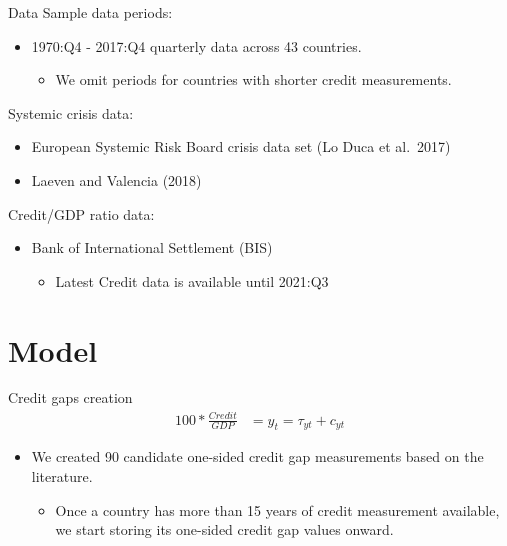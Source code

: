 \documentclass[
  ignorenonframetext,
]{beamer}
\providecommand{\tightlist}{%
  \setlength{\itemsep}{0pt}\setlength{\parskip}{0pt}}
\begin{document}
\begin{frame}{Data}
\protect\hypertarget{data}{}
Sample data periods:

\begin{itemize}
\tightlist
\item
  1970:Q4 - 2017:Q4 quarterly data across 43 countries.

  \begin{itemize}
  \tightlist
  \item
    We omit periods for countries with shorter credit measurements.
  \end{itemize}
\end{itemize}

Systemic crisis data:

\begin{itemize}
\tightlist
\item
  European Systemic Risk Board crisis data set (Lo Duca et al.~2017)
\item
  Laeven and Valencia (2018)
\end{itemize}

Credit/GDP ratio data:

\begin{itemize}
\tightlist
\item
  Bank of International Settlement (BIS)

  \begin{itemize}
  \tightlist
  \item
    Latest Credit data is available until 2021:Q3
  \end{itemize}
\end{itemize}
\end{frame}

\hypertarget{model}{%
\section{Model}\label{model}}

\begin{frame}{Credit gaps creation}
\protect\hypertarget{credit-gaps-creation}{}
\begin{align}
    100*\frac{Credit}{GDP} &= y_t = \tau_{yt} + c_{yt}
\end{align}

\begin{itemize}
\tightlist
\item
  We created 90 candidate one-sided credit gap measurements based on the
  literature.

  \begin{itemize}
  \tightlist
  \item
    Once a country has more than 15 years of credit measurement
    available, we start storing its one-sided credit gap values onward.
  \end{itemize}
\end{itemize}
\end{frame}
\end{document}
